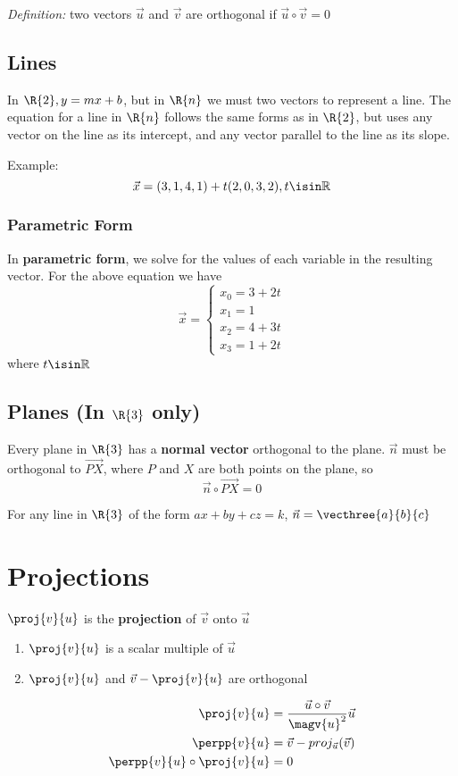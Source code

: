 \documentclass[12pt]{article}
\begin{document}
\textit{Definition:} two vectors $\vec{u}$ and $\vec{v}$ are orthogonal if $\vec{u}\circ\vec{v} = 0$

\subsection*{Lines}
In $\R{2}, y = mx + b$, but in $\R{n}$ we must two vectors to represent a line. The equation for a line in $\R{n}$ follows the same forms as in $\R{2}$, but uses any vector on the line as its intercept, and any vector parallel to the line as its slope.

Example: \[ \vec{x} = (3,1,4,1) + t(2,0,3,2), t\isin\mathbb{R} \]

\subsubsection*{Parametric Form}
In {\bf parametric form}, we solve for the values of each variable in the resulting vector. For the above equation we have
\[ \vec{x} = 
  \begin{cases}
   x_0 = 3 + 2t\\
   x_1 = 1\\
   x_2 = 4 + 3t\\
   x_3 = 1 + 2t
  \end{cases}
\]
where $t\isin\mathbb{R}$

\subsection*{Planes (In $\R{3}$ only)}
Every plane in $\R{3}$ has a {\bf normal vector} orthogonal to the plane. $\vec{n}$ must be orthogonal to $\vec{PX}$, where $P$ and $X$ are both points on the plane, so \[ \vec{n}\circ\vec{PX}=0 \]

For any line in $\R{3}$ of the form $ax + by + cz = k$, $\vec{n} = \vecthree{a}{b}{c}$

\section*{Projections}
$\proj{v}{u}$ is the {\bf projection} of $\vec{v}$ onto $\vec{u}$
\begin{enumerate}
\item $\proj{v}{u}$ is a scalar multiple of $\vec{u}$
\item $\proj{v}{u}$ and $\vec{v} - \proj{v}{u}$ are orthogonal
\end{enumerate}

\begin{align*}
\proj{v}{u} &= \frac{\vec{u}\circ\vec{v}}{\magv{u}^2}\vec{u}\\
\perpp{v}{u} &= \vec{v} - proj_{\vec{u}}(\vec{v})\\
\perpp{v}{u}\circ\proj{v}{u} &= 0
\end{align*}
\end{document}
